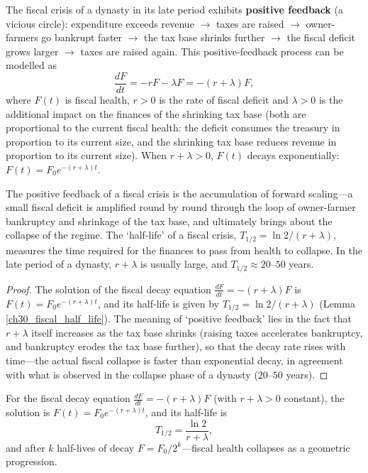 \begin{proposition}\label{prop:fiscal_crisis_feedback}
The fiscal crisis of a dynasty in its late period exhibits \textbf{positive feedback} (a vicious circle): expenditure exceeds revenue $\to$ taxes are raised $\to$ owner-farmers go bankrupt faster $\to$ the tax base shrinks further $\to$ the fiscal deficit grows larger $\to$ taxes are raised again. This positive-feedback process can be modelled as
\[
\frac{dF}{dt} = -rF - \lambda F = -(r+\lambda)F,
\]
where $F(t)$ is fiscal health, $r > 0$ is the rate of fiscal deficit and $\lambda > 0$ is the additional impact on the finances of the shrinking tax base (both are proportional to the current fiscal health: the deficit consumes the treasury in proportion to its current size, and the shrinking tax base reduces revenue in proportion to its current size). When $r + \lambda > 0$, $F(t)$ decays exponentially: $F(t) = F_0 e^{-(r+\lambda)t}$.

The positive feedback of a fiscal crisis is the accumulation of forward scaling---a small fiscal deficit is amplified round by round through the loop of owner-farmer bankruptcy and shrinkage of the tax base, and ultimately brings about the collapse of the regime. The `half-life' of a fiscal crisis, $T_{1/2} = \ln 2/(r+\lambda)$, measures the time required for the finances to pass from health to collapse. In the late period of a dynasty, $r+\lambda$ is usually large, and $T_{1/2} \approx 20$--$50$ years.
\end{proposition}

\begin{proof}
The solution of the fiscal decay equation $\frac{dF}{dt} = -(r+\lambda)F$ is $F(t) = F_0 e^{-(r+\lambda)t}$, and its half-life is given by $T_{1/2} = \ln 2/(r+\lambda)$ (Lemma \ref{ch30_fiscal_half_life}). The meaning of `positive feedback' lies in the fact that $r+\lambda$ itself increases as the tax base shrinks (raising taxes accelerates bankruptcy, and bankruptcy erodes the tax base further), so that the decay rate rises with time---the actual fiscal collapse is faster than exponential decay, in agreement with what is observed in the collapse phase of a dynasty ($20$--$50$ years).
\end{proof}

\begin{lemma}\label{ch30_fiscal_half_life}
For the fiscal decay equation $\frac{dF}{dt} = -(r+\lambda)F$ (with $r+\lambda > 0$ constant), the solution is $F(t) = F_0 e^{-(r+\lambda)t}$, and its half-life is
\[
T_{1/2} = \frac{\ln 2}{r+\lambda},
\]
and after $k$ half-lives of decay $F = F_0 / 2^k$---fiscal health collapses as a geometric progression.
\end{lemma}

